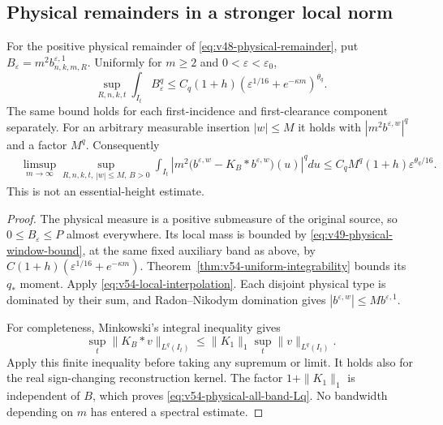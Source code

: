 \subsection{Physical remainders in a stronger local norm}
\begin{theorem}
\label{thm:v54-physical-Lq}
For the positive physical remainder of
\eqref{eq:v48-physical-remainder}, put
$B_\varepsilon=m^2b_{n,k,m,R}^{\varepsilon,1}$. Uniformly for
$m\ge2$ and $0<\varepsilon<\varepsilon_0$,
\begin{equation}\label{eq:v54-physical-Lq}
 \sup_{R,n,k,t}\int_{I_t}B_\varepsilon^q
 \le C_q(1+h)
              (\varepsilon^{1/16}+e^{-\kappa m})^{\theta_q}.
\end{equation}
The same bound holds for each first-incidence and first-clearance
component separately. For an arbitrary measurable insertion $|w|\le M$
it holds with $|m^2b^{\varepsilon,w}|^q$ and a factor $M^q$.
Consequently
\begin{align}
 &\limsup_{m\to\infty}\sup_{R,n,k,t,\,|w|\le M,\,B>0}
 \int_{I_t}\left|m^2\bigl(b^{\varepsilon,w}
                       -K_B*b^{\varepsilon,w}\bigr)(u)\right|^qdu
 \le C_q M^q(1+h)\varepsilon^{\theta_q/16}.
 \label{eq:v54-physical-all-band-Lq}
\end{align}
This is not an essential-height estimate.
\end{theorem}
\begin{proof}
The physical measure is a positive submeasure of the original source,
so $0\le B_\varepsilon\le P$ almost everywhere. Its local mass is
bounded by \eqref{eq:v49-physical-window-bound}, at the same fixed
auxiliary band as above, by
$C(1+h)(\varepsilon^{1/16}+e^{-\kappa m})$.
Theorem~\ref{thm:v54-uniform-integrability} bounds its $q_*$ moment.
Apply \eqref{eq:v54-local-interpolation}. Each disjoint physical type
is dominated by their sum, and Radon--Nikodym domination gives
$|b^{\varepsilon,w}|\le M b^{\varepsilon,1}$.

For completeness, Minkowski's integral inequality gives
\[
 \sup_t\|K_B*v\|_{L^q(I_t)}
       \le\|K_1\|_1\sup_t\|v\|_{L^q(I_t)}.
\]
Apply this finite inequality before taking any supremum or limit.
It holds also for the real sign-changing reconstruction kernel. The
factor $1+\|K_1\|_1$ is independent of $B$, which proves
\eqref{eq:v54-physical-all-band-Lq}. No bandwidth depending on $m$
has entered a spectral estimate.
\end{proof}

